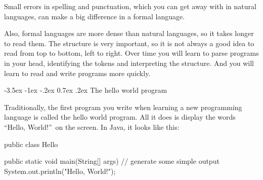 \documentclass[12pt]{book}
\makeatletter
\newcommand{\term}[1]{%
\index{#1}
\item[#1:]}
\theoremstyle{exercise}
\renewcommand{\section}{\@startsection {section}{1}{\z@}%
    {-3.5ex \@plus -1ex \@minus -.2ex}%
    {0.7ex \@plus.2ex}%
    {\normalfont\Large\bfseries}}
\makeatother
\begin{document}







Small errors in spelling and punctuation, which you can get away with in natural languages, can make a big difference in a formal language.

Also, formal languages are more dense than natural languages, so it takes longer to read them.
The structure is very important, so it is not always a good idea to read from top to bottom, left to right.
Over time you will learn to parse programs in your head, identifying the tokens and interpreting the structure.
And you will learn to read and write programs more quickly.



\section{The hello world program}
\label{sec:hello}


Traditionally, the first program you write when learning a new programming language is called the hello world program.
All it does is display the words ``Hello, World!''\ on the screen.
In Java, it looks like this:

\begin{code}
public class Hello {

    public static void main(String[] args) {
        // generate some simple output
        System.out.println("Hello, World!");
    }

}
\end{code}
\end{document}
